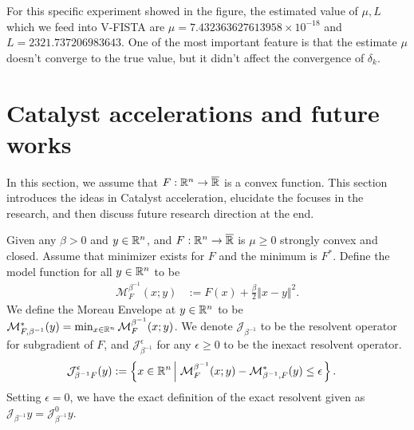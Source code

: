 \documentclass[12pt]{article}
\begin{document}
        For this specific experiment showed in the figure, the estimated value of $\mu, L$ which we feed into V-FISTA are $\mu = 7.432363627613958\times 10^{-18}$ and $L = 2321.737206983643$. 
        One of the most important feature is that the estimate $\mu$ doesn't converge to the true value, but it didn't affect the convergence of $\delta_k$. 

        

\section{Catalyst accelerations and future works}\label{sec:catalyst}
    In this section, we assume that $F: \mathbb R^n \rightarrow \overline {\mathbb R}$ is a convex function. 
    This section introduces the ideas in Catalyst acceleration, elucidate the focuses in the research, and then discuss future research direction at the end. 
    \begin{assumption}\label{ass:catalyst1}
        Given any $\beta > 0$ and $y \in \mathbb R^n$, and $F: \mathbb R^n\rightarrow \overline {\mathbb R}$ is $\mu \ge 0$ strongly convex and closed. 
        Assume that minimizer exists for $F$ and the minimum is $F^*$. 
        Define the model function for all $y\in \mathbb R^n$ to be 
        \begin{align*}
            \mathcal M^{\beta^{-1}}_F(x; y) &:= 
            F(x) + \frac{\beta}{2}\Vert x - y\Vert^2.
        \end{align*}
        We define the Moreau Envelope at $y \in \mathbb R^n$ to be $\mathcal M^*_{F,\beta^{-1}}(y) = \min_{x\in \mathbb R^n} \mathcal M_F^{\beta^{-1}}(x; y)$. 
        We denote $\mathcal J_{\beta^{-1}}$ to be the resolvent operator for subgradient of $F$, and $\mathcal J_{\beta^{-1}}^\epsilon$ for any $\epsilon \ge 0$ to be the inexact resolvent operator. 
        \begin{align*}
            \mathcal J_{\beta^{-1}F}^\epsilon (y) &:= 
            \left\lbrace
                x \in \mathbb R^n \left | \; 
                    \mathcal M^{\beta^{-1}}_F(x; y) - 
                    \mathcal M_{\beta^{-1}, F}^*(y) \le \epsilon
                \right.
            \right\rbrace. 
        \end{align*}
        Setting $\epsilon = 0$, we have the exact definition of the exact resolvent given as $\mathcal J_{\beta^{-1}}y = \mathcal J^0_{\beta^{-1}}y$. 
    \end{assumption}
\end{document}
